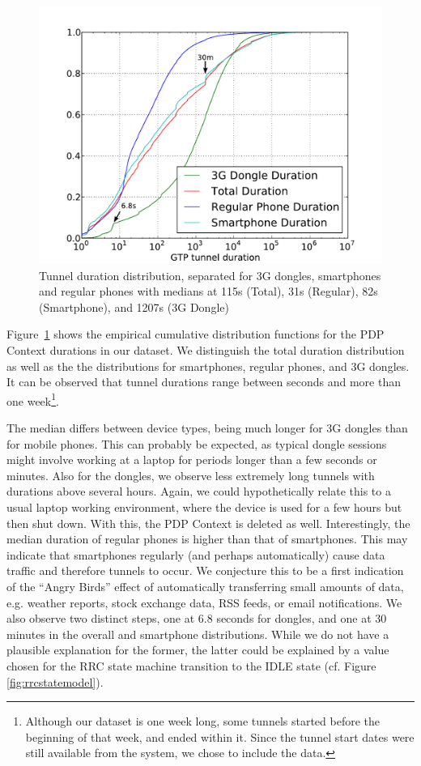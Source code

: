 \begin{figure}
	\centering
	\includegraphics[width=\columnwidth]{images/tunnel-dur-class-cdf-mod.pdf}
	\caption{Tunnel duration distribution, separated for 3G dongles, smartphones and regular phones with medians at 115s (Total), 31s (Regular), 82s (Smartphone), and 1207s (3G Dongle)}
	\label{fig:cdf-duration-device-class-CONEXT}
\end{figure}

Figure~\ref{fig:cdf-duration-device-class-CONEXT} shows the empirical cumulative distribution functions for the PDP Context durations in our dataset. We distinguish the total duration distribution as well as the the distributions for smartphones, regular phones, and 3G dongles. It can be observed that tunnel durations range between  seconds and more than one week\footnote{Although our dataset is one week long, some tunnels started before the beginning of that week, and ended within it. Since the tunnel start dates were still available from the system, we chose to include the data.}.

The median differs between device types, being much longer for 3G dongles than for mobile phones. This can probably be expected, as typical dongle sessions might involve working at a laptop for periods longer than a few seconds or minutes. Also for the dongles, we observe less extremely long tunnels with durations above several hours. Again, we could hypothetically relate this to a usual laptop working environment, where the device is used for a few hours but then shut down. With this, the PDP Context is deleted as well. Interestingly, the median duration of regular phones is higher than that of smartphones. This may indicate that  smartphones regularly (and perhaps automatically) cause data traffic and therefore tunnels to occur. We conjecture this to be a first indication of the ``Angry Birds'' effect of automatically transferring small amounts of data, e.g. weather reports, stock exchange data, RSS feeds, or email notifications. We also observe two distinct steps, one at 6.8 seconds for dongles, and one at 30 minutes in the overall and smartphone distributions. While we do not have a plausible explanation for the former, the latter could be explained by a value chosen for the RRC state machine transition to the IDLE state (cf. Figure \ref{fig:rrcstatemodel}).


